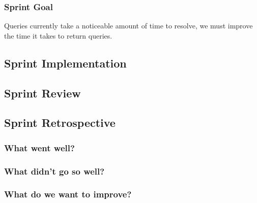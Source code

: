 \subsubsection{Sprint Goal}

Queries currently take a noticeable amount of time to resolve, we must improve the time it takes to return queries.

\subsection{Sprint Implementation}

\subsection{Sprint Review}

\subsection{Sprint Retrospective}

\subsubsection{What went well?}

\subsubsection{What didn't go so well?}

\subsubsection{What do we want to improve?}